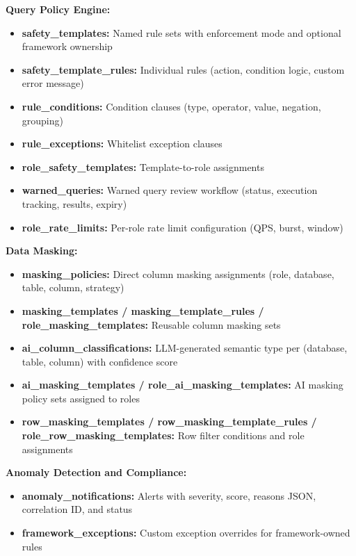 \textbf{Query Policy Engine:}
\begin{itemize}[leftmargin=*]
    \item \textbf{safety\_templates:} Named rule sets with enforcement mode and optional framework ownership
    \item \textbf{safety\_template\_rules:} Individual rules (action, condition logic, custom error message)
    \item \textbf{rule\_conditions:} Condition clauses (type, operator, value, negation, grouping)
    \item \textbf{rule\_exceptions:} Whitelist exception clauses
    \item \textbf{role\_safety\_templates:} Template-to-role assignments
    \item \textbf{warned\_queries:} Warned query review workflow (status, execution tracking, results, expiry)
    \item \textbf{role\_rate\_limits:} Per-role rate limit configuration (QPS, burst, window)
\end{itemize}

\textbf{Data Masking:}
\begin{itemize}[leftmargin=*]
    \item \textbf{masking\_policies:} Direct column masking assignments (role, database, table, column, strategy)
    \item \textbf{masking\_templates / masking\_template\_rules / role\_masking\_templates:} Reusable column masking sets
    \item \textbf{ai\_column\_classifications:} LLM-generated semantic type per (database, table, column) with confidence score
    \item \textbf{ai\_masking\_templates / role\_ai\_masking\_templates:} AI masking policy sets assigned to roles
    \item \textbf{row\_masking\_templates / row\_masking\_template\_rules / role\_row\_masking\_templates:} Row filter conditions and role assignments
\end{itemize}

\textbf{Anomaly Detection and Compliance:}
\begin{itemize}[leftmargin=*]
    \item \textbf{anomaly\_notifications:} Alerts with severity, score, reasons JSON, correlation ID, and status
    \item \textbf{framework\_exceptions:} Custom exception overrides for framework-owned rules
\end{itemize}


